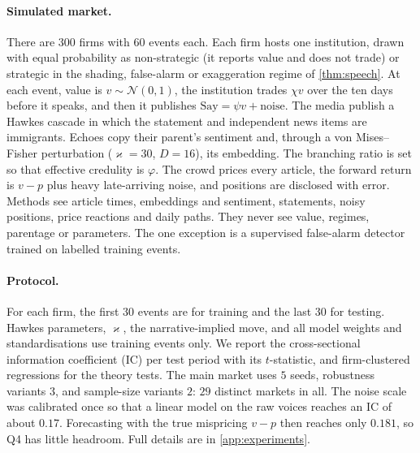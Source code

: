 \documentclass{article}
\theoremstyle{plain}
\theoremstyle{definition}
\theoremstyle{remark}
\newcommand{\N}{\mathcal{N}}
\begin{document}
\paragraph{Simulated market.} There are $300$ firms with $60$ events each. Each firm hosts one institution, drawn with equal probability as non-strategic (it reports value and does not trade) or strategic in the shading, false-alarm or exaggeration regime of \cref{thm:speech}. At each event, value is $v\sim\N(0,1)$, the institution trades $\chi v$ over the ten days before it speaks, and then it publishes $\text{Say}=\psi v+\text{noise}$. The media publish a Hawkes cascade in which the statement and independent news items are immigrants. Echoes copy their parent's sentiment and, through a von Mises--Fisher perturbation ($\varkappa=30$, $D=16$), its embedding. The branching ratio is set so that effective credulity is $\varphi$. The crowd prices every article, the forward return is $v-p$ plus heavy late-arriving noise, and positions are disclosed with error. Methods see article times, embeddings and sentiment, statements, noisy positions, price reactions and daily paths. They never see value, regimes, parentage or parameters. The one exception is a supervised false-alarm detector trained on labelled training events.

\paragraph{Protocol.} For each firm, the first $30$ events are for training and the last $30$ for testing. Hawkes parameters, $\varkappa$, the narrative-implied move, and all model weights and standardisations use training events only. We report the cross-sectional information coefficient (IC) per test period with its $t$-statistic, and firm-clustered regressions for the theory tests. The main market uses $5$ seeds, robustness variants $3$, and sample-size variants $2$: $29$ distinct markets in all. The noise scale was calibrated once so that a linear model on the raw voices reaches an IC of about $0.17$. Forecasting with the true mispricing $v-p$ then reaches only $0.181$, so Q4 has little headroom. Full details are in \cref{app:experiments}.
\end{document}
